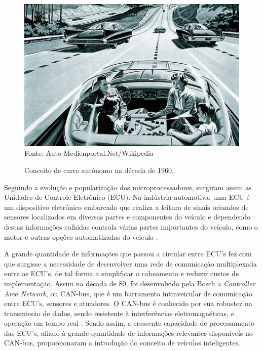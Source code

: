 \begin{figure}[!htb]
\centering
\caption{Conceito de carro autônomo na década de 1960.} %
\includegraphics[scale=0.4]{aut_car.jpg}\\  %
{\small Fonte: Auto-Medienportal.Net/Wikipedia} %
\label{fig:aut_car60} %
\end{figure}

Seguindo a evolução e popularização dos microprocessadores, surgiram assim as Unidades de Controle Eletrônico (ECU). Na indústria automotiva, uma ECU é um dispositivo eletrônico embarcado que realiza a leitura de sinais oriundos de sensores localizados em diversas partes e componentes do veículo e dependendo destas informações colhidas controla várias partes importantes do veículo, como o motor e outras opções automatizadas do veículo \cite{Ebert2009}.

A grande quantidade de informações que passou a circular entre ECU's fez com que surgisse a necessidade de desenvolver uma rede de comunicação multiplexada entre as ECU's, de tal forma a simplificar o cabeamento e reduzir custos de implementação. Assim na década de 80, foi desenvolvido pela Bosch a \textit{Controller Area Network}, ou CAN-bus, que é um barramento intraveicular de comunicação entre ECU's, sensores e atuadores. O CAN-bus é conhecido por sua robustez na transmissão de dados, sendo resistente à interferências eletromagnéticas, e operação em tempo real \cite{Tuohy2014b}. Sendo assim, a crescente capacidade de processamento das ECU's, aliado à grande quantidade de informações relevantes disponíveis no CAN-bus, proporcionaram a introdução do conceito de veículos inteligentes.


